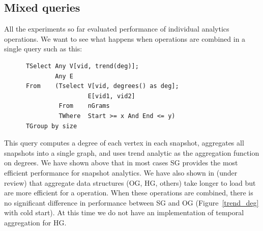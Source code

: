 \subsection{Mixed queries}

All the experiments so far evaluated performance of individual \ql
analytics operations.  We want to see what happens when operations are
combined in a single query such as this:

\begin{small}
\begin{verbatim}
      TSelect Any V[vid, trend(deg)];
              Any E
      From    (Tselect V[vid, degrees() as deg]; 
                       E[vid1, vid2]
               From    nGrams
               TWhere  Start >= x And End <= y)
      TGroup by size
\end{verbatim}
\end{small}

This query computes a degree of each vertex in each snapshot,
aggregates all snapshots into a single graph, and uses trend analytic
as the aggregation function on degrees.  We have shown above that in
most cases SG provides the most efficient performance for snapshot
analytics.  We have also shown in (under review) that aggregate data
structures (OG, HG, others) take longer to load but are more efficient
for a  operation.  When these operations are combined,
there is no significant difference in performance between SG and OG
(Figure~\ref{trend_deg} with cold start).  At this time we do not have
an implementation of temporal aggregation for HG.

